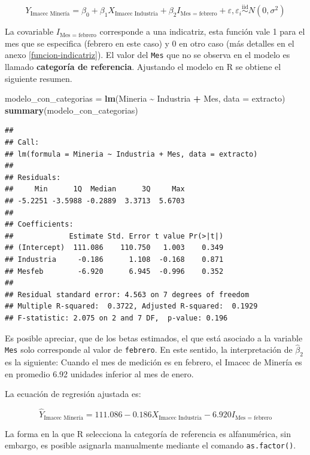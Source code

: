 \documentclass[
  11pt,
]{book}
\newenvironment{Shaded}{\begin{snugshade}}{\end{snugshade}}
\newcommand{\AttributeTok}[1]{\textcolor[rgb]{0.13,0.29,0.53}{#1}}
\newcommand{\FunctionTok}[1]{\textcolor[rgb]{0.13,0.29,0.53}{\textbf{#1}}}
\newcommand{\NormalTok}[1]{#1}
\newcommand{\OtherTok}[1]{\textcolor[rgb]{0.56,0.35,0.01}{#1}}
\newcommand{\SpecialCharTok}[1]{\textcolor[rgb]{0.81,0.36,0.00}{\textbf{#1}}}
\theoremstyle{definition}
\theoremstyle{definition}
\theoremstyle{definition}
\theoremstyle{definition}
\theoremstyle{remark}
\begin{document}
\[Y_{\text{Imacec Minería}} = \beta_0 + \beta_1X_{\text{Imacec Industria}} + \beta_2I_{\text{Mes = febrero}} + \varepsilon, \varepsilon_i \overset{\text{iid}}{\sim} N(0,\sigma^2)\]

La covariable \(I_{\text{Mes = febrero}}\) corresponde a una indicatriz, esta función vale 1 para el mes que se especifica (febrero en este caso) y 0 en otro caso (más detalles en el anexo \ref{funcion-indicatriz}). El valor del \texttt{Mes} que no se observa en el modelo es llamado \textbf{categoría de referencia}. Ajustando el modelo en R se obtiene el siguiente resumen.

\begin{Shaded}
\begin{Highlighting}[]
\NormalTok{modelo\_con\_categorias }\OtherTok{=} \FunctionTok{lm}\NormalTok{(Mineria }\SpecialCharTok{\textasciitilde{}}\NormalTok{ Industria }\SpecialCharTok{+}\NormalTok{ Mes, }\AttributeTok{data =}\NormalTok{ extracto) }
\FunctionTok{summary}\NormalTok{(modelo\_con\_categorias)}
\end{Highlighting}
\end{Shaded}

\begin{verbatim}
## 
## Call:
## lm(formula = Mineria ~ Industria + Mes, data = extracto)
## 
## Residuals:
##     Min      1Q  Median      3Q     Max 
## -5.2251 -3.5988 -0.2889  3.3713  5.6703 
## 
## Coefficients:
##             Estimate Std. Error t value Pr(>|t|)
## (Intercept)  111.086    110.750   1.003    0.349
## Industria     -0.186      1.108  -0.168    0.871
## Mesfeb        -6.920      6.945  -0.996    0.352
## 
## Residual standard error: 4.563 on 7 degrees of freedom
## Multiple R-squared:  0.3722, Adjusted R-squared:  0.1929 
## F-statistic: 2.075 on 2 and 7 DF,  p-value: 0.196
\end{verbatim}

Es posible apreciar, que de los betas estimados, el que está asociado a la variable \texttt{Mes} solo corresponde al valor de \texttt{febrero}. En este sentido, la interpretación de \(\widehat{\beta}_2\) es la siguiente: Cuando el mes de medición es en febrero, el Imacec de Minería es en promedio 6.92 unidades inferior al mes de enero.

La ecuación de regresión ajustada es:

\[\widehat{Y}_{\text{Imacec Minería}} = 111.086 - 0.186X_{\text{Imacec Industria}} - 6.920I_{\text{Mes = febrero}}\]

La forma en la que R selecciona la categoría de referencia es alfanumérica, sin embargo, es posible asignarla manualmente mediante el comando \texttt{as.factor()}.
\end{document}
